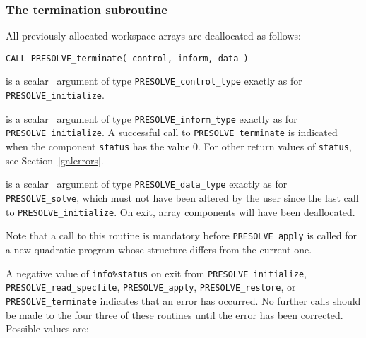 \documentclass{galahad}
\newcommand{\packagename}{PRESOLVE}
\begin{document}

\subsubsection{The  termination subroutine}
All previously allocated workspace arrays are deallocated as follows:
\vspace*{1mm}

\hspace{8mm}
{\tt CALL \packagename\_terminate( control, inform, data )}

\begin{description}
 is a scalar \intentin\ argument of type
{\tt \packagename\_control\_type}
exactly as for
{\tt \packagename\_initialize}.

 is a scalar \intentout\ argument of type
{\tt \packagename\_inform\_type}
exactly as for
{\tt \packagename\_initialize}.
A successful call to {\tt \packagename\_terminate}
is indicated when the component {\tt status} has the value 0.
For other return values of {\tt status}, see Section~\ref{galerrors}.

 is a scalar \intentinout\ argument of type
{\tt \packagename\_data\_type}
exactly as for
{\tt \packagename\_solve},
which must not have been altered by the user since the last call to
{\tt \packagename\_initialize}.
On exit, array components will have been deallocated.
\end{description}

\noindent
Note that a call to this routine is mandatory before {\tt \packagename\_apply}
is called for a new quadratic program whose structure differs from the current
one.


\galerrors
A negative value of {\tt info\%status} on exit from
{\tt \packagename\_initialize},
{\tt \packagename\_read\_specfile},
{\tt \packagename\_apply},
{\tt \packagename\_restore},
or
{\tt \packagename\_terminate}
indicates that an error has occurred. No further calls should be made
to the four three of these routines until the error has been
corrected. Possible values are:
\end{document}
